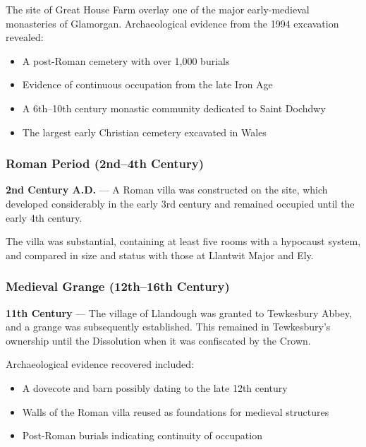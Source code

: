 \documentclass[11pt,a4paper]{article}
\begin{document}
The site of Great House Farm overlay one of the major early-medieval monasteries of Glamorgan. Archaeological evidence from the 1994 excavation revealed:

\begin{itemize}
    \item A post-Roman cemetery with over 1,000 burials
    \item Evidence of continuous occupation from the late Iron Age
    \item A 6th--10th century monastic community dedicated to Saint Dochdwy
    \item The largest early Christian cemetery excavated in Wales
\end{itemize}

\subsubsection{Roman Period (2nd--4th Century)}

\begin{timeline}
\textbf{2nd Century A.D.} --- A Roman villa was constructed on the site, which developed considerably in the early 3rd century and remained occupied until the early 4th century.
\end{timeline}

The villa was substantial, containing at least five rooms with a hypocaust system, and compared in size and status with those at Llantwit Major and Ely.

\subsubsection{Medieval Grange (12th--16th Century)}

\begin{timeline}
\textbf{11th Century} --- The village of Llandough was granted to Tewkesbury Abbey, and a grange was subsequently established. This remained in Tewkesbury's ownership until the Dissolution when it was confiscated by the Crown.
\end{timeline}

Archaeological evidence recovered included:
\begin{itemize}
    \item A dovecote and barn possibly dating to the late 12th century
    \item Walls of the Roman villa reused as foundations for medieval structures
    \item Post-Roman burials indicating continuity of occupation
\end{itemize}
\end{document}
